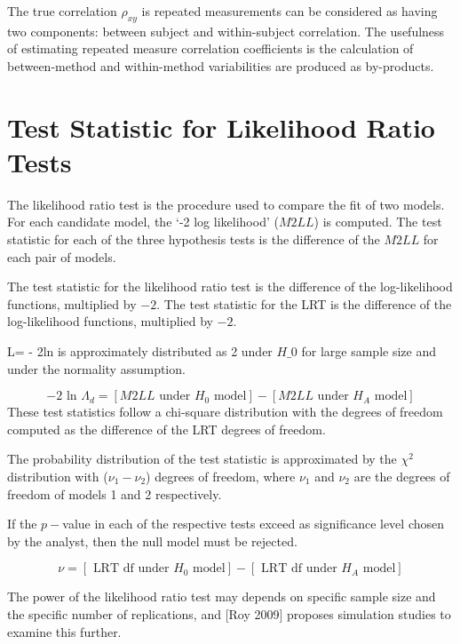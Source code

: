 \documentclass[12pt, a4paper]{report}
\theoremstyle{plain}
\theoremstyle{definition}
\theoremstyle{remark}
\begin{document}
The true correlation $\rho_{xy}$ is repeated measurements can be considered as having two components: between subject and within-subject correlation. The usefulness of estimating repeated measure correlation coefficients is the calculation of between-method and within-method variabilities are produced as by-products.

\section{Test Statistic for Likelihood Ratio Tests}
The likelihood ratio test is the procedure used to compare the fit of two models. For each candidate model, the `-2 log likelihood' ($M2LL$) is computed. The test statistic for each of the three hypothesis tests is the difference of the $M2LL$ for each pair of models. 

The test statistic for the likelihood ratio test is the difference of the log-likelihood functions, multiplied by $-2$. 
The test statistic for the LRT is the difference of the log-likelihood functions, multiplied by $-2$.

L= - 2ln is approximately distributed as 2 under $H\_0$ for large sample size and under the normality assumption.

\begin{equation}
-2\mbox{ ln }\Lambda_{d} =  [ M2LL \mbox{ under }H_{0} \mbox{ model}] - [ M2LL \mbox{ under }H_{A} \mbox{ model}]
\end{equation}
These test statistics follow a chi-square distribution with the degrees of freedom computed as the difference of the LRT degrees of freedom.

The probability distribution of the test statistic is approximated by the $\chi^2$ distribution with ($\nu_{1} - \nu_{2}$) degrees of freedom, where $\nu_{1}$  and $\nu_{2}$ are the degrees of freedom of models 1 and 2 respectively.

If the $p-$value in each of the respective tests exceed as significance level chosen by the analyst, then the null model must be rejected.


\begin{equation}
\nu = [\mbox{ LRT df under }H_{0} \mbox{ model}] - [\mbox{ LRT df under }H_{A} \mbox{ model}]
\end{equation}

The power of the likelihood ratio test may depends on specific sample size and the specific number of replications, and [Roy 2009] proposes simulation studies to examine this further.
\end{document}
